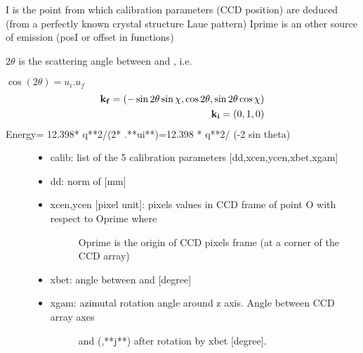 \documentclass[letterpaper,10pt,english]{sphinxmanual}
\begin{document}
I is the point from which calibration parameters (CCD position) are deduced (from a perfectly known crystal structure Laue pattern)
Iprime is an other source of emission (posI or offset in functions)

\(2 \theta\) is the scattering angle between  and , i.e.

\(\cos(2 \theta)=u_i.u_f\)
\begin{align*}\!\begin{aligned}
{\bf k_f} = ( -\sin 2 \theta \sin \chi, \cos 2\theta, \sin 2\theta \cos \chi)\\
{\bf k_i} = (0, 1, 0)\\
\end{aligned}\end{align*}
Energy= 12.398*  q**2/(2* .**ui**)=12.398 * q**2/ (-2 sin theta)
\begin{description}
\item[{}] \leavevmode\begin{itemize}
\item {} 
calib: list of the 5 calibration parameters {[}dd,xcen,ycen,xbet,xgam{]}

\item {} 
dd: norm of   {[}mm{]}

\item {} \begin{description}
\item[{xcen,ycen {[}pixel unit{]}: pixels values in CCD frame of point O with respect to Oprime where}] \leavevmode
Oprime is the origin of CCD pixels frame (at a corner of the CCD array)

\end{description}

\item {} 
xbet: angle between  and  {[}degree{]}

\item {} \begin{description}
\item[{xgam: azimutal rotation angle around z axis. Angle between CCD array axes}] \leavevmode
and (,**j**) after rotation by xbet {[}degree{]}.

\end{description}

\end{itemize}

\end{description}
\end{document}
